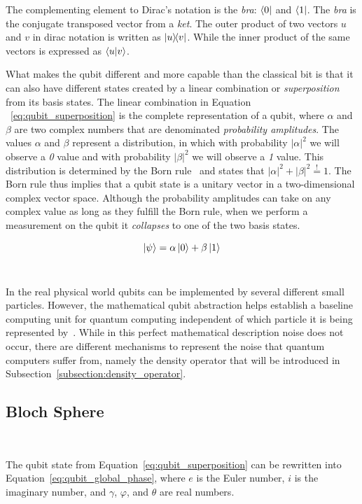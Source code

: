The complementing element to Dirac's notation is the \textit{bra}:
\(\bra{0}\) and \(\bra{1}\). The \textit{bra} is the conjugate transposed
vector from a \textit{ket}. The outer product of two vectors \(u\) and
\(v\) in dirac notation is written as \(\ketbra{u}{v}\). While the inner
product of the same vectors is expressed as \(\braket{u}{v}\). \

What makes the qubit different and more capable than
the classical bit is that it can also have different states
created by a linear combination or \textit{superposition} from
its basis states. The linear combination in Equation
~\ref{eq:qubit_superposition} is the complete representation
of a qubit, where \(\alpha\) and \(\beta\) are two complex numbers that
are denominated \textit{probability amplitudes}.
The values \(\alpha\) and \(\beta\) represent a distribution, in which
with probability \(|\alpha|^2\) we will observe a \textit{0}
value and with probability \(|\beta|^2\) we will observe a
\textit{1} value. This distribution is determined by the
Born rule~\cite{born_quantenmechanik_1926} and states that \(|\alpha|^2 + |\beta|^2 \stackrel{!}{=} 1\).
The Born rule thus implies that a qubit state is a unitary vector in
a two-dimensional complex vector space. Although the
probability amplitudes can take on any complex value as long
as they fulfill the Born rule, when we perform a measurement
on the qubit it \textit{collapses} to one of the two basis
states. \

\begin{equation}\label{eq:qubit_superposition}
  \ket{\psi} = \alpha\ket{0} + \beta\ket{1}
\end{equation} \

In the real physical world qubits can be implemented by
several different small particles. However, the mathematical
qubit abstraction helps establish a baseline computing unit
for quantum computing independent of which particle it is
being represented by~\cite{nielsen_quantum_2010}. While in this perfect
mathematical description noise does not occur, there are
different mechanisms to represent the noise that quantum
computers suffer from, namely the density operator that will
be introduced in Subsection~\ref{subsection:density_operator}. \

\subsection{Bloch Sphere}\label{subsection:bloch} \

The qubit state from Equation~\ref{eq:qubit_superposition} can be
rewritten into Equation~\ref{eq:qubit_global_phase}, where \(e\)
is the Euler number, \(i\) is the imaginary number, and \(\gamma\),
\(\varphi\), and \(\theta\) are real numbers. \

